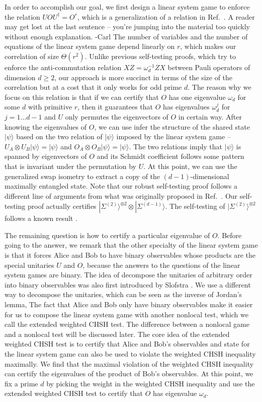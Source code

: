 \documentclass[11pt,letterpaper]{article}
\newcommand{\ket}[1]{|#1\rangle}
\newcommand{\x}{\otimes}
\newcommand{\ct}{^{\dagger}}
\newcommand{\1}{\mathbb{1}}
\newcommand{\EPR}[1]{\Sigma^{(#1)}}
\def\carl#1{{\color{blue} #1 -Carl}}
\theoremstyle{definition}
\begin{document}
In order to accomplish our goal, we first design a linear system game to enforce the 
relation $UOU\ct = O^r$, which is a generalization of a relation in Ref.~\cite{slofstra2017}.  \carl{A reader may get lost at the last sentence -- you're jumping into the material too quickly without enough explanation.}
The number of variables and the number of equations of the linear system game depend linearly on $r$,
which makes our correlation of size $\Theta(r^2)$.
Unlike previous self-testing proofs, which try to enforce the anti-commutation relation
$XZ = \omega_d^{-1} ZX$ between Pauli operators of dimension $d \geq 2$, 
our approach is more succinct in terms of the size of the correlation but at a cost that
it only works for odd prime $d$.
The reason why we focus on this relation is that if we can certify that $O$ has one eigenvalue $\omega_d$
for some $d$ with primitive $r$,
then it guarantees that $O$ has eigenvalues $\omega_d^j$ for $j = 1 \dots d-1$ and $U$ only
permutes the eigenvectors of $O$ in certain way.
After knowing the eigenvalues of $O$, we can use infer the structure of the shared state $\ket{\psi}$
based on the two relation of $\ket{\psi}$ imposed by the linear system game --
$U_A \x U_B \ket{\psi} = \ket{\psi}$ and $O_A \x O_B \ket{\psi} = \ket{\psi}$.
The two relations imply that $\ket{\psi}$ is spanned by eigenvectors of $O$ and its
Schmidt coefficient follows some pattern that is invariant under the permutation by $U$.
At this point, we can use the generalized swap isometry \cite{yang2013} to extract a copy of the 
$(d-1)$-dimensional maximally entangled state. Note that our robust self-testing proof 
follows a different line of arguments from what was originally
proposed in Ref.~\cite{yang2013}.
Our self-testing proof actually certifies $\ket{\EPR{2}}^{\x 2} \x \ket{\EPR{d-1}}$. 
The self-testing of $\ket{\EPR{2}}^{\x 2}$ follows a known result \cite{wu2016}.

The remaining question is how to certify a particular eigenvalue of $O$. Before going to the answer,
we remark that 
the other specialty of the linear system game is that it forces Alice and Bob to have binary observables
whose products are the special unitaries $U$ and $O$, because the answers to the questions of the 
linear system games are binary. 
The idea of decompose the unitaries of arbitrary order into binary observables was also first introduced by Slofstra \cite{slofstra2017}.
We use a different way to decompose the unitaries, which can be seen as the inverse of Jordan's lemma, 
The fact that Alice and Bob only have binary observables make it easier for us 
to compose the linear system game with another nonlocal test, which we call the extended weighted CHSH test.
The difference between a nonlocal game and a nonlocal test will be discussed later.
The core idea of the extended weighted CHSH test is to certify that Alice and Bob's observables and state 
for the linear system game can also be used to violate the weighted CHSH inequality \cite{acin2012} maximally.
We find that the maximal violation of the weighted CHSH inequality can certify the eigenvalues of the product
of Bob's observables. 
At this point, we fix a prime $d$ by picking the weight in the weighted CHSH inequality and 
use the extended weighted CHSH test to certify that
$O$ has eigenvalue $\omega_d$.
\end{document}
